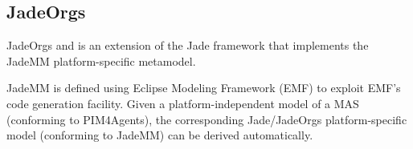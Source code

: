 \subsection{JadeOrgs}

JadeOrgs
\cite{Madrigal-Mora08} and \cite{Madrigal-Mora09}
is an extension of the Jade framework that implements the JadeMM platform-specific metamodel.

JadeMM is defined using Eclipse Modeling Framework (EMF) to exploit EMF's code generation facility.
Given a platform-independent model of a MAS (conforming to PIM4Agents), the corresponding Jade/JadeOrgs platform-specific model (conforming to JadeMM) can be derived automatically.